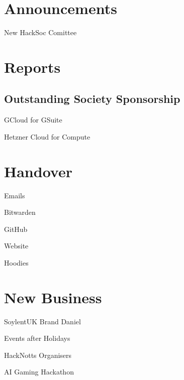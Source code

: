 \documentclass[11pt,hacksoc,agenda]{meetingmins}
\begin{document}
\maketitle

\section{Announcements}
\begin{items}
  \item New HackSoc Comittee

\end{items}

\section{Reports}

\subsection{Outstanding Society Sponsorship}
\begin{hiddensubitems}
\item GCloud for GSuite
\item Hetzner Cloud for Compute
\end{hiddensubitems}

\section{Handover}
\begin{items}
\item Emails
\item Bitwarden
\item GitHub
\item Website
\item Hoodies
\end{items}

\section{New Business}
\begin{items}
\item SoylentUK Brand Daniel
\item Events after Holidays
\item HackNotts Organisers
\item AI Gaming Hackathon
\end{items}

\vspace{1em}
\nextmeeting{}
\end{document}
